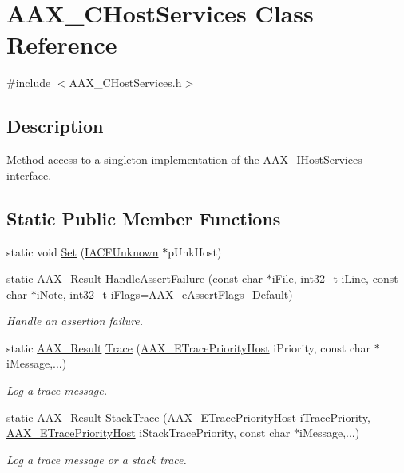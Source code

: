 \hypertarget{a00021}{}\section{A\+A\+X\+\_\+\+C\+Host\+Services Class Reference}
\label{a00021}


{\ttfamily \#include $<$A\+A\+X\+\_\+\+C\+Host\+Services.\+h$>$}



\subsection{Description}
Method access to a singleton implementation of the \hyperlink{a00103}{A\+A\+X\+\_\+\+I\+Host\+Services} interface. \subsection*{Static Public Member Functions}
\begin{DoxyCompactItemize}
\item 
static void \hyperlink{a00021_af927887d03f4f978fb90d8ac3df1f205}{Set} (\hyperlink{a00146}{I\+A\+C\+F\+Unknown} $\ast$p\+Unk\+Host)
\item 
static \hyperlink{a00149_a4d8f69a697df7f70c3a8e9b8ee130d2f}{A\+A\+X\+\_\+\+Result} \hyperlink{a00021_a17f333ba14d681bc84309b8a5632e6a4}{Handle\+Assert\+Failure} (const char $\ast$i\+File, int32\+\_\+t i\+Line, const char $\ast$i\+Note, int32\+\_\+t i\+Flags=\hyperlink{a00206_ab87a565fcd58c3d860d50a210b264985a46c4ae37bd14e71bfd34781038f5f508}{A\+A\+X\+\_\+e\+Assert\+Flags\+\_\+\+Default})
\begin{DoxyCompactList}\small\item\em Handle an assertion failure. \end{DoxyCompactList}\item 
static \hyperlink{a00149_a4d8f69a697df7f70c3a8e9b8ee130d2f}{A\+A\+X\+\_\+\+Result} \hyperlink{a00021_ad724c59469bd8a08fee0816539a08997}{Trace} (\hyperlink{a00206_a2dd667e4dea5781f38832fd9f1725f1b}{A\+A\+X\+\_\+\+E\+Trace\+Priority\+Host} i\+Priority, const char $\ast$i\+Message,...)
\begin{DoxyCompactList}\small\item\em Log a trace message. \end{DoxyCompactList}\item 
static \hyperlink{a00149_a4d8f69a697df7f70c3a8e9b8ee130d2f}{A\+A\+X\+\_\+\+Result} \hyperlink{a00021_a9edeb9a0dfebf147f9e87dee521ec2c7}{Stack\+Trace} (\hyperlink{a00206_a2dd667e4dea5781f38832fd9f1725f1b}{A\+A\+X\+\_\+\+E\+Trace\+Priority\+Host} i\+Trace\+Priority, \hyperlink{a00206_a2dd667e4dea5781f38832fd9f1725f1b}{A\+A\+X\+\_\+\+E\+Trace\+Priority\+Host} i\+Stack\+Trace\+Priority, const char $\ast$i\+Message,...)
\begin{DoxyCompactList}\small\item\em Log a trace message or a stack trace. \end{DoxyCompactList}\end{DoxyCompactItemize}


